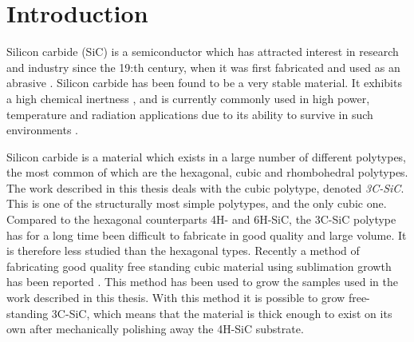 
\chapter{Introduction}






Silicon carbide (SiC) is a semiconductor which has attracted interest in research and industry since the 19:th century, when it was first fabricated and used as an abrasive \cite{Acheson1893}. Silicon carbide has been found to be a very stable material. It exhibits a high chemical inertness \cite{Hume1941}, and is currently commonly used in high power, temperature and radiation applications due to its ability to survive in such environments \cite{J.B.CASADYandR.W.JOHNSON1996}. 

Silicon carbide is a material which exists in a large number of different polytypes, the most common of which are the hexagonal, cubic and rhombohedral polytypes. The work described in this thesis deals with the cubic polytype, denoted \emph{3C-SiC}. This is one of the structurally most simple polytypes, and the only cubic one. Compared to the hexagonal counterparts 4H- and 6H-SiC, the 3C-SiC polytype has for a long time been difficult to fabricate in good quality and large volume. It is therefore less studied than the hexagonal types. Recently a method of fabricating good quality free standing cubic material using sublimation growth has been reported \cite{Jokubavicius2014}. This method has been used to grow the samples used in the work described in this thesis. With this method it is possible to grow free-standing 3C-SiC, which means that the material is thick enough to exist on its own after mechanically polishing away the 4H-SiC substrate. 

